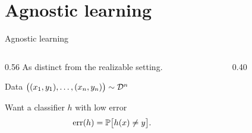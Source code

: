 
\section{Agnostic learning}

\begin{frame}{Agnostic learning}
  \begin{columns}[c]
    \begin{column}{0.56\textwidth}
      \textcolor{muted}{As distinct from the realizable setting.}

      \vspace{1em}
      Data $\big((x_1,y_1),\dots,(x_n,y_n)\big) \sim \mathcal{D}^n$

      \vspace{0.5em}
      Want a classifier $h$ with low error
      \[
        \mathrm{err}(h) = \mathbb{P}\big[h(x) \neq y\big].
      \]

      \vspace{0.5em}
    \end{column}
    \begin{column}{0.40\textwidth}
      \centering

      \vspace{0.3em}
      \noisylegend
    \end{column}
  \end{columns}
\end{frame}

